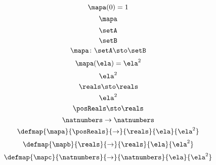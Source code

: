 {\begin{forslides}
        \begin{equation}
            \label{eq:slides_session2_79}
            \mapa(0) =1
        \end{equation}
        \begin{equation}
            \label{eq:slides_session2_80}
            \mapa
        \end{equation}
        \begin{equation}
            \label{eq:slides_session2_81}
            \setA
        \end{equation}
        \begin{equation}
            \label{eq:slides_session2_82}
            \setB
        \end{equation}
        \begin{equation}
            \label{eq:slides_session2_83}
            \mapa\colon \setA \sto \setB
        \end{equation}
        \begin{equation}
            \label{eq:slides_session2_84}
            \mapa(\ela)=\ela^2
        \end{equation}
        \begin{equation}
            \label{eq:slides_session2_85}
            \ela^2
        \end{equation}
        \begin{equation}
            \label{eq:slides_session2_86}
            \reals \sto \reals
        \end{equation}
        \begin{equation}
            \label{eq:slides_session2_87}
            \ela^2
        \end{equation}
        \begin{equation}
            \label{eq:slides_session2_88}
            \posReals \sto \reals
        \end{equation}
        \begin{equation}
            \label{eq:slides_session2_89}
            \natnumbers \to \natnumbers
        \end{equation}
        \begin{equation}
            \label{eq:slides_session2_90}
            \defmap{\mapa}{\posReals}{\to}{\reals}{\ela}{\ela^2}
        \end{equation}
        \begin{equation}
            \label{eq:slides_session2_91}
            \defmap{\mapb}{\reals}{\to}{\reals}{\ela}{\ela^2}
        \end{equation}
        \begin{equation}
            \label{eq:slides_session2_92}
            \defmap{\mapc}{\natnumbers}{\to}{\natnumbers}{\ela}{\ela^2}
        \end{equation}


\end{forslides}}
